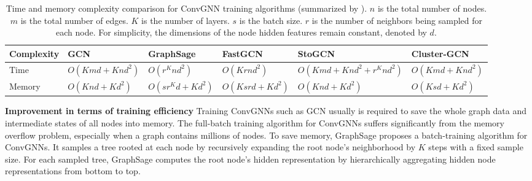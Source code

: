 \begin{table}[]
\centering
\caption{Time and memory complexity comparison for ConvGNN training algorithms (summarized by \cite{chiang2019cluster}). $n$ is the total number of nodes. $m$ is the total number of edges. $K$ is the number of layers. $s$ is the batch size. $r$ is the number of neighbors being sampled for each node. For simplicity, the dimensions of the node hidden features remain constant, denoted by $d$.}
\label{tab:complex}
\begin{tabular}{llllll}
\toprule
     Complexity             & GCN \cite{kipf2017semi} & GraphSage \cite{hamilton2017inductive} & FastGCN \cite{chen2018fastgcn} & StoGCN \cite{chen2018stochastic}  & Cluster-GCN \cite{chiang2019cluster} \\ \midrule
Time    &  $O(Kmd+Knd^2)$    &   $O(r^Knd^2)$       &  $O(Krnd^2)$       &   $O(Kmd+Knd^2+r^Knd^2)$              &       $O(Kmd+Knd^2)$      \\ \hline
Memory &  $O(Knd+Kd^2)$   &    $O(sr^Kd+Kd^2)$       &   $O(Ksrd+Kd^2)$      & $O(Knd+Kd^2)$                 &  $O(Ksd+Kd^2)$    
\\ \bottomrule
\end{tabular}
\end{table}
	
	\vspace{2mm}
	\noindent\textbf{Improvement in terms of training efficiency}
	Training ConvGNNs such as GCN \cite{kipf2017semi} usually is required to save the whole graph data and intermediate states of all nodes into memory. The full-batch training algorithm for ConvGNNs suffers significantly from the memory overflow problem, especially when a graph contains millions of nodes.  To save memory,  GraphSage \cite{hamilton2017inductive} proposes a batch-training algorithm for ConvGNNs. It samples a tree rooted at each node by recursively expanding the root node's neighborhood by $K$ steps with a fixed sample size. For each sampled tree, GraphSage computes the root node's hidden representation by hierarchically aggregating hidden node representations from bottom to top. %
	
